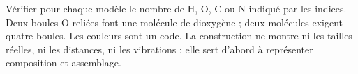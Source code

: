 \par\noindent\begin{minipage}{\linewidth}
\label{cor-activite-5}
Vérifier pour chaque modèle le nombre de H, O, C ou N indiqué par les indices. Deux boules O reliées font une molécule de dioxygène ; deux molécules exigent quatre boules. Les couleurs sont un code. La construction ne montre ni les tailles réelles, ni les distances, ni les vibrations ; elle sert d’abord à représenter composition et assemblage.\par\end{minipage}
